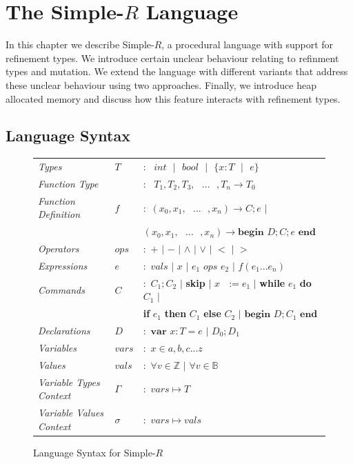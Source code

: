 \documentclass[a4paper,12pt]{report}
\begin{document}
\chapter{The Simple-$R$ Language} \label{chapter:simple_r}
In this chapter we describe Simple-$R$, a procedural language 
with support for refinement types. We introduce certain unclear behaviour 
relating to refinment types and mutation. We extend the language with different 
variants that address these unclear behaviour using two approaches. Finally, 
we introduce heap allocated memory and discuss how this feature interacts 
with refinement types. 

\section{Language Syntax}
\begin{figure}[h]
  \begin{center}
    \begin{tabular}{l l l}
      \textit{Types} & $T$ & $:\text{ }int\text{ }|\text{ }bool\text{ }|
      \text{ }\{x: T\text{ }|\text{ }e\}$\\
      \textit{Function Type} &  & $:\text{ }T_1, T_2,T_3,\text{ }...\text{ },T_n\longrightarrow T_0$\\
      \textit{Function Definition} & $f$ & $:$ $(x_0,x_1,\text{ }...\text{ },x_n) \longrightarrow C;e$ $|$ \\ 
      & & \; $(x_0,x_1,\text{ }...\text{ },x_n) \longrightarrow \textbf{begin } D;C;e\textbf{ end}$\\
      \textit{Operators} & $ops$ & $:$ $+$ $|$ $-$ $|$ $\wedge$ $|$ $\vee$ $|$ $<$ $|$ $>$ \\
      \textit{Expressions} & $e$ & $:$ $vals$ $|$ $x$ $|$ $e_1$ $ops$ $e_2$ 
      $|$ $f(e_1...e_n)$ \\
      \textit{Commands} & $C$ & $:$ $C_1;C_2$ $|$ \textbf{skip} $|$ $x\text{ }:= e_1$ 
      $|$ \textbf{while} $e_1$ \textbf{do} $C_1$ $|$ \\ 
        & & \; \textbf{if} $e_1$ \textbf{then} $C_1$ \textbf{else} $C_2$ $|$ 
        $\textbf{begin } D;C_1\textbf{ end}$ \\
      \textit{Declarations} & $D$ & $:$ $\textbf{var } x : T = e$ $|$ $D_0;D_1$\\
      \textit{Variables} & $vars$& $:$ $x \in {a,b,c...z}$\\
      \textit{Values} & $vals$& $:$ $\forall v \in \mathbb{Z}$ $|$ $\forall v \in \mathbb{B}$\\
      \textit{Variable Types Context} & $\Gamma$& $:$ $vars \mapsto T$\\
      \textit{Variable Values Context} & $\sigma$& $:$ $vars \mapsto vals$
    \end{tabular}
  \end{center}
  \caption{Language Syntax for Simple-$R$}
  \label{fig:simple_r_syntax}
\end{figure}
\end{document}
